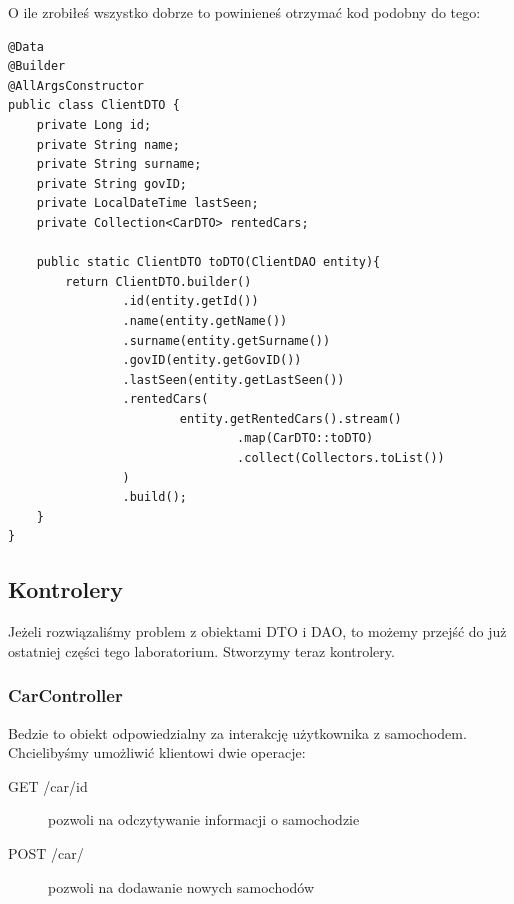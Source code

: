 \documentclass{article}
\begin{document}
                O ile zrobiłeś wszystko dobrze to powinieneś otrzymać kod podobny do tego:
                \begin{verbatim}
@Data
@Builder
@AllArgsConstructor
public class ClientDTO {
    private Long id;
    private String name;
    private String surname;
    private String govID;
    private LocalDateTime lastSeen;
    private Collection<CarDTO> rentedCars;

    public static ClientDTO toDTO(ClientDAO entity){
        return ClientDTO.builder()
                .id(entity.getId())
                .name(entity.getName())
                .surname(entity.getSurname())
                .govID(entity.getGovID())
                .lastSeen(entity.getLastSeen())
                .rentedCars(
                        entity.getRentedCars().stream()
                                .map(CarDTO::toDTO)
                                .collect(Collectors.toList())
                )
                .build();
    }
}
                \end{verbatim}
        \subsection{Kontrolery}
            Jeżeli rozwiązaliśmy problem z obiektami DTO i DAO, to możemy przejść do już ostatniej części tego laboratorium. Stworzymy teraz kontrolery.
            \subsubsection{CarController}
                Bedzie to obiekt odpowiedzialny za interakcję użytkownika z samochodem. Chcielibyśmy umożliwić klientowi dwie operacje:
                \begin{description}
                    \item[GET /car/{id}] pozwoli na odczytywanie informacji o samochodzie 
                    \item[POST /car/]  pozwoli na dodawanie nowych samochodów
                \end{description}
                
        
\end{document}
